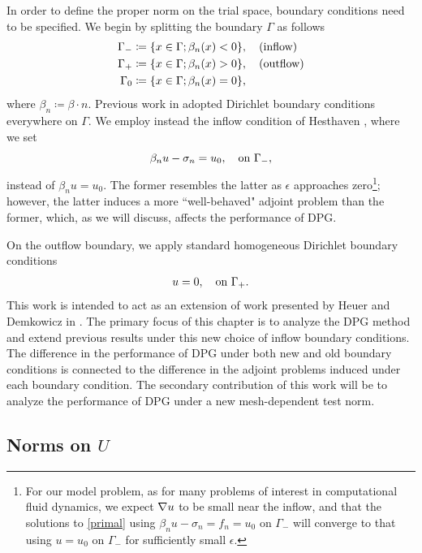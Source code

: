 In order to define the proper norm on the trial space, boundary
conditions need to be specified. We begin by splitting the boundary
$\Gamma$ as follows
\begin{align*}
\Gamma_{-} &\coloneqq \{x\in \Gamma; \beta_n(x) < 0\}, \quad {\rm
  (inflow)}\\ \Gamma_{+} &\coloneqq \{x\in \Gamma; \beta_n(x) > 0\},
\quad {\rm (outflow)}\\ \Gamma_{0} &\coloneqq \{x\in \Gamma;
\beta_n(x) = 0\},
\end{align*}
where $\beta_n \coloneqq \beta \cdot n$.
Previous work in \cite{DPGrobustness} adopted Dirichlet boundary
conditions everywhere on $\Gamma$.  
We employ instead the inflow
condition of Hesthaven \etal \cite{Hesthaven96astable}, where we set
\[
\beta_n u - \sigma_n  = u_0, \quad \text{on } \Gm,
\]
instead of $\beta_n u = u_0$. The former resembles the latter
as $\epsilon$ approaches zero\footnote{For our model problem, as for many problems of interest in computational fluid dynamics, we expect $\grad u$ to be small near the inflow, and that the solutions to \eqref{primal} using $\beta_n u - \sigma_n = f_n = u_0$ on $\Gamma_-$ will converge to that using $u=u_0$ on $\Gamma_-$  for sufficiently small $\epsilon$.}; however, the latter induces a more ``well-behaved" adjoint problem than the former, which, as we will discuss, affects the performance of DPG. 

On the outflow boundary, we apply standard homogeneous Dirichlet boundary conditions
\[
u = 0, \quad \text{on } \Gp.
\]
This work is intended to act as an extension of work presented by Heuer and Demkowicz in \cite{DPGrobustness}. The primary focus of this chapter is to analyze the DPG method and extend previous results under this new choice of inflow boundary conditions. The difference in the performance of DPG under both new and old boundary conditions is connected to the difference in the adjoint problems induced under each boundary condition. The secondary contribution of this work will be to analyze the performance of DPG under a new mesh-dependent test norm. 

\subsection{Norms on $U$}

